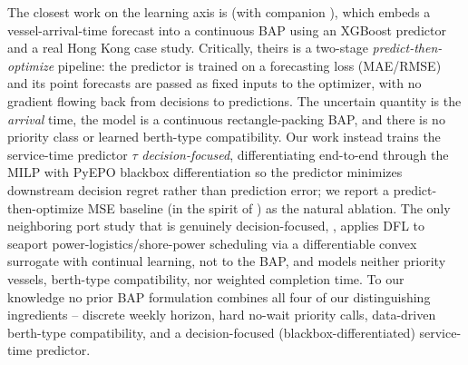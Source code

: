 The closest work on the learning axis is \citet{chu2025integrating} (with
companion \citealp{chu2026coordinated}), which embeds a vessel-arrival-time
forecast into a continuous BAP using an XGBoost predictor and a real Hong Kong
case study. Critically, theirs is a two-stage \emph{predict-then-optimize}
pipeline: the predictor is trained on a forecasting loss (MAE/RMSE) and its
point forecasts are passed as fixed inputs to the optimizer, with no gradient
flowing back from decisions to predictions. The uncertain quantity is the
\emph{arrival} time, the model is a continuous rectangle-packing BAP, and there
is no priority class or learned berth-type compatibility. Our work instead
trains the service-time predictor $\tau$ \emph{decision-focused}, differentiating
end-to-end through the MILP with PyEPO blackbox differentiation
\citep{pogancic2020blackbox} so the predictor minimizes downstream decision
regret rather than prediction error; we report a predict-then-optimize MSE
baseline (in the spirit of \citealp{elmachtoub2022spo}) as the natural ablation.
The only neighboring port study that is genuinely decision-focused,
\citet{pu2025predictthenoptimize}, applies DFL to seaport
power-logistics/shore-power scheduling via a differentiable convex surrogate with
continual learning, not to the BAP, and models neither priority vessels,
berth-type compatibility, nor weighted completion time. To our knowledge no
prior BAP formulation combines all four of our distinguishing ingredients --
discrete weekly horizon, hard no-wait priority calls, data-driven berth-type
compatibility, and a decision-focused (blackbox-differentiated) service-time
predictor.

